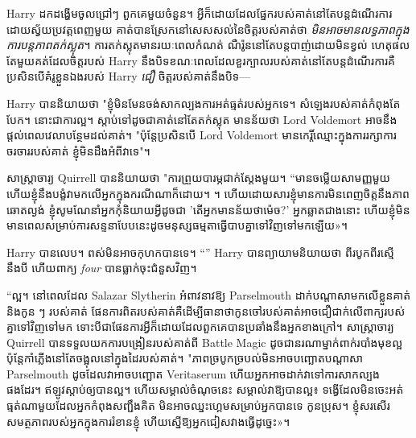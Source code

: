 Harry ដកដង្ហើមចូលជ្រៅៗ ពួកគេមួយចំនួន។ អ្វីក៏ដោយដែលផ្នែករបស់គាត់នៅតែបន្តដំណើរការដោយស្វ័យប្រវត្តពេញមួយ គាត់បានស្រែកនៅសេសសល់នៃចិត្តរបស់គាត់ថា \emph{មិនអាចមានលទ្ធភាពក្នុងការបន្តភាពតក់ស្លុត}។ ការតក់ស្លុតមានរយៈពេលកំណត់ ណឺរ៉ូននៅតែបន្តបាញ់ដោយមិនខ្វល់ ហេតុផលតែមួយគត់ដែលចិត្តរបស់ Harry នឹងបិទខណៈពេលដែលខួរក្បាលរបស់គាត់នៅតែបន្តដំណើរការគឺប្រសិនបើគំរូខ្លួនឯងរបស់ Harry \emph{ជឿ} ចិត្តរបស់គាត់នឹងបិទ—

Harry បាននិយាយថា "ខ្ញុំមិនមែនចង់សាកល្បងការអត់ធ្មត់របស់អ្នកទេ។ សំឡេង​របស់​គាត់​កំពុង​តែ​បែក។ នោះជាការល្អ។ ស្តាប់ទៅដូចជាគាត់នៅតែតក់ស្លុត មានន័យថា Lord Voldemort អាចនឹងផ្តល់ពេលវេលាបន្ថែមដល់គាត់។ "ប៉ុន្តែប្រសិនបើ Lord Voldemort មានកេរ្តិ៍ឈ្មោះក្នុងការរក្សាការចរចាររបស់គាត់ ខ្ញុំមិនដឹងអំពីវាទេ"។

សាស្រ្តាចារ្យ Quirrell បាននិយាយថា "ការព្រួយបារម្ភជាក់ស្តែងមួយ។ “មាន​ចម្លើយ​សាមញ្ញ​មួយ ហើយ​ខ្ញុំ​នឹង​បង្ខំ​វា​មក​លើ​អ្នក​ក្នុង​ករណី​ណា​ក៏​ដោយ។ ។ ហើយ​ដោយ​សារ​ខ្ញុំ​មាន​ការ​មិន​ពេញ​ចិត្ត​នឹង​ភាព​ឆោតល្ងង់ ខ្ញុំ​សូម​ណែនាំ​អ្នក​កុំ​និយាយ​អ្វី​ដូច​ជា 'តើ​អ្នក​មាន​ន័យ​ថា​ម៉េច?' អ្នក​ឆ្លាត​ជាង​នោះ ហើយ​ខ្ញុំ​មិន​មាន​ពេល​សម្រាប់​ការ​សន្ទនា​បែប​នេះ​ដូច​មនុស្ស​ធម្មតា​ធ្វើ​បាប​គ្នា​ទៅ​វិញ​ទៅ​មក​ឡើយ»។

Harry បានលេប។ ពស់មិនអាចកុហកបានទេ។ “” Harry បានព្យាយាមនិយាយថា ពីរបូកពីរស្មើនឹងបី ហើយពាក្យ \emph{four} បានធ្លាក់ចុះជំនួសវិញ។

“ល្អ។ នៅពេលដែល Salazar Slytherin អំពាវនាវឱ្យ Parselmouth ដាក់បណ្តាសាមកលើខ្លួនគាត់និងកូន ៗ របស់គាត់ ផែនការពិតរបស់គាត់គឺដើម្បីធានាថាកូនចៅរបស់គាត់អាចជឿជាក់លើពាក្យរបស់គ្នាទៅវិញទៅមក ទោះបីជាផែនការអ្វីក៏ដោយដែលពួកគេបានប្រឆាំងនឹងអ្នកខាងក្រៅ។ សាស្រ្តាចារ្យ Quirrell បានទទួលយកការបង្រៀនរបស់គាត់ពី Battle Magic ដូចជានរណាម្នាក់ពាក់របាំងមុខល្អ ប៉ុន្តែកាំភ្លើងនៅតែចង្អុលនៅក្នុងដៃរបស់គាត់។ "ភាពច្របូកច្របល់មិនអាចបញ្ឆោតបណ្តាសា Parselmouth ដូចដែលវាអាចបញ្ឆោត Veritaserum ហើយអ្នកអាចដាក់វាទៅការសាកល្បងផងដែរ។ ឥឡូវ​ស្តាប់​ឲ្យ​បាន​ល្អ។  ហើយសម្គាល់ចំណុចនេះ សម្គាល់វាឱ្យបានល្អ៖  ទង្វើដែលមិនចេះអត់ធ្មត់ណាមួយដែលអ្នកកំពុងសញ្ជឹងគិត មិនអាចឈ្នះហ្គេមសម្រាប់អ្នកបានទេ កូនប្រុស។ ខ្ញុំ​សរសើរ​សមត្ថភាព​របស់​អ្នក​ក្នុង​ការ​រំខាន​ខ្ញុំ ហើយ​ស្នើ​ឱ្យ​អ្នក​ជៀសវាង​ធ្វើ​ដូច្នេះ​»។

